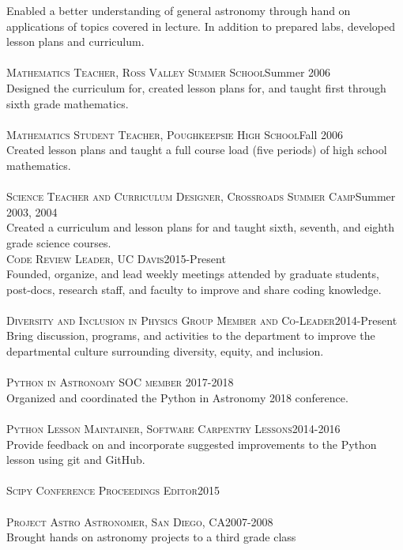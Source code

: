 \documentclass[10pt]{cv}
\begin{document}
\begin{llist}
Enabled a better understanding of general astronomy through hand on applications of topics covered in lecture. In addition to prepared labs, developed lesson plans and curriculum.\\
\\
\textsc{Mathematics Teacher, Ross Valley Summer School}\hfill Summer 2006\\
Designed the curriculum for, created lesson plans for, and taught first through sixth grade mathematics.\\
\\
\textsc{Mathematics Student Teacher, Poughkeepsie High School}\hfill Fall 2006\\
Created lesson plans and taught a full course load (five periods) of high school mathematics.\\
\\
\textsc{Science Teacher and Curriculum Designer, Crossroads Summer Camp}\hfill Summer 2003, 2004 \\
Created a curriculum and lesson plans for and taught sixth, seventh, and eighth grade science courses.\\
\textsc{Code Review Leader, UC Davis}\hfill 2015-Present\\
Founded, organize, and lead weekly meetings attended by graduate students, post-docs, research staff, and faculty to improve and share coding knowledge.\\
\\
\textsc{Diversity and Inclusion in Physics Group Member and Co-Leader}\hfill 2014-Present\\
Bring discussion, programs, and activities to the department to improve the departmental culture surrounding diversity, equity, and inclusion.\\
\\
\textsc{Python in Astronomy SOC member} \hfill 2017-2018\\
Organized and coordinated the Python in Astronomy 2018 conference.\\
\\
\textsc{Python Lesson Maintainer, Software Carpentry Lessons}\hfill 2014-2016\\
Provide feedback on and incorporate suggested improvements to the Python lesson using git and GitHub.\\
\\
\textsc{Scipy Conference Proceedings Editor}\hfill 2015\\
\\
\textsc{Project Astro Astronomer, San Diego, CA}\hfill 2007-2008\\
Brought hands on astronomy projects to a third grade class\\
\\
\end{llist}
\end{document}
